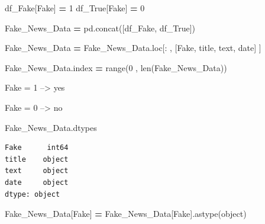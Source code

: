 \documentclass[
  11pt,
  a4paper,
]{article}
\newenvironment{Shaded}{\begin{snugshade}}{\end{snugshade}}
\newcommand{\BuiltInTok}[1]{#1}
\newcommand{\DecValTok}[1]{\textcolor[rgb]{0.00,0.00,0.81}{#1}}
\newcommand{\NormalTok}[1]{#1}
\newcommand{\OperatorTok}[1]{\textcolor[rgb]{0.81,0.36,0.00}{\textbf{#1}}}
\newcommand{\StringTok}[1]{\textcolor[rgb]{0.31,0.60,0.02}{#1}}
\begin{document}
\begin{Shaded}
\begin{Highlighting}[]
\NormalTok{df\_Fake[}\StringTok{\textquotesingle{}Fake\textquotesingle{}}\NormalTok{] }\OperatorTok{=} \DecValTok{1}
\NormalTok{df\_True[}\StringTok{\textquotesingle{}Fake\textquotesingle{}}\NormalTok{] }\OperatorTok{=} \DecValTok{0}
\end{Highlighting}
\end{Shaded}

\begin{Shaded}
\begin{Highlighting}[]
\NormalTok{Fake\_News\_Data }\OperatorTok{=}\NormalTok{ pd.concat([df\_Fake, df\_True])}
\end{Highlighting}
\end{Shaded}

\begin{Shaded}
\begin{Highlighting}[]
\NormalTok{Fake\_News\_Data }\OperatorTok{=}\NormalTok{ Fake\_News\_Data.loc[: , [}\StringTok{\textquotesingle{}Fake\textquotesingle{}}\NormalTok{, }\StringTok{\textquotesingle{}title\textquotesingle{}}\NormalTok{, }\StringTok{\textquotesingle{}text\textquotesingle{}}\NormalTok{, }\StringTok{\textquotesingle{}date\textquotesingle{}}\NormalTok{] ]}
\end{Highlighting}
\end{Shaded}

\begin{Shaded}
\begin{Highlighting}[]
\NormalTok{Fake\_News\_Data.index }\OperatorTok{=} \BuiltInTok{range}\NormalTok{(}\DecValTok{0}\NormalTok{ , }\BuiltInTok{len}\NormalTok{(Fake\_News\_Data))}
\end{Highlighting}
\end{Shaded}

Fake = 1 --\textgreater{} yes

Fake = 0 --\textgreater{} no

\begin{Shaded}
\begin{Highlighting}[]
\NormalTok{Fake\_News\_Data.dtypes}
\end{Highlighting}
\end{Shaded}

\begin{verbatim}
Fake      int64
title    object
text     object
date     object
dtype: object
\end{verbatim}

\begin{Shaded}
\begin{Highlighting}[]
\NormalTok{Fake\_News\_Data[}\StringTok{\textquotesingle{}Fake\textquotesingle{}}\NormalTok{] }\OperatorTok{=}\NormalTok{ Fake\_News\_Data[}\StringTok{\textquotesingle{}Fake\textquotesingle{}}\NormalTok{].astype(}\StringTok{\textquotesingle{}object\textquotesingle{}}\NormalTok{)}
\end{Highlighting}
\end{Shaded}
\end{document}
